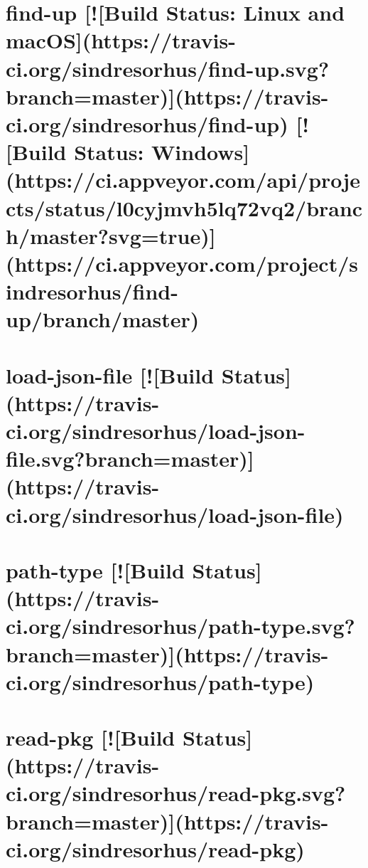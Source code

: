 \documentclass[twoside]{book}
\newcommand{\+}{\discretionary{\mbox{\scriptsize$\hookleftarrow$}}{}{}}
\begin{document}
\chapter{find-\/up \mbox{[}!\mbox{[}Build Status\+: Linux and mac\+OS\mbox{]}(https\+://travis-\/ci.org/sindresorhus/find-\/up.svg?branch=master)\mbox{]}(https\+://travis-\/ci.org/sindresorhus/find-\/up) \mbox{[}!\mbox{[}Build Status\+: Windows\mbox{]}(https\+://ci.appveyor.\+com/api/projects/status/l0cyjmvh5lq72vq2/branch/master?svg=true)\mbox{]}(https\+://ci.appveyor.\+com/project/sindresorhus/find-\/up/branch/master)}
\label{md_dsmacc_vis_degree_node_modules_get-package-info_node_modules_find-up_readme}

\chapter{load-\/json-\/file \mbox{[}!\mbox{[}Build Status\mbox{]}(https\+://travis-\/ci.org/sindresorhus/load-\/json-\/file.svg?branch=master)\mbox{]}(https\+://travis-\/ci.org/sindresorhus/load-\/json-\/file)}
\label{md_dsmacc_vis_degree_node_modules_get-package-info_node_modules_load-json-file_readme}

\chapter{path-\/type \mbox{[}!\mbox{[}Build Status\mbox{]}(https\+://travis-\/ci.org/sindresorhus/path-\/type.svg?branch=master)\mbox{]}(https\+://travis-\/ci.org/sindresorhus/path-\/type)}
\label{md_dsmacc_vis_degree_node_modules_get-package-info_node_modules_path-type_readme}

\chapter{read-\/pkg \mbox{[}!\mbox{[}Build Status\mbox{]}(https\+://travis-\/ci.org/sindresorhus/read-\/pkg.svg?branch=master)\mbox{]}(https\+://travis-\/ci.org/sindresorhus/read-\/pkg)}
\label{md_dsmacc_vis_degree_node_modules_get-package-info_node_modules_read-pkg_readme}

\end{document}

